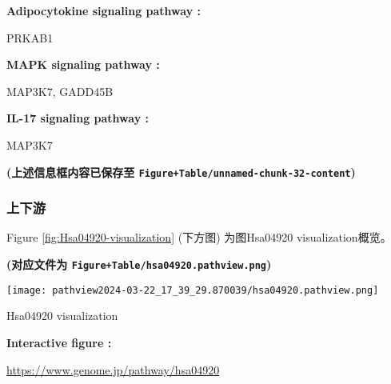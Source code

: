\documentclass[
]{article}
\begin{document}
\begin{center}\begin{tcolorbox}[colback=gray!10, colframe=gray!50, width=0.9\linewidth, arc=1mm, boxrule=0.5pt]
\textbf{
Adipocytokine signaling pathway
:}

\vspace{0.5em}

    PRKAB1

\vspace{2em}


\textbf{
MAPK signaling pathway
:}

\vspace{0.5em}

    MAP3K7, GADD45B

\vspace{2em}


\textbf{
IL-17 signaling pathway
:}

\vspace{0.5em}

    MAP3K7

\vspace{2em}
\end{tcolorbox}
\end{center}

\textbf{(上述信息框内容已保存至 \texttt{Figure+Table/unnamed-chunk-32-content})}

\hypertarget{epi-path}{%
\subsubsection{上下游}\label{epi-path}}

Figure \ref{fig:Hsa04920-visualization} (下方图) 为图Hsa04920 visualization概览。

\textbf{(对应文件为 \texttt{Figure+Table/hsa04920.pathview.png})}

\def\@captype{figure}
\begin{center}
\texttt{[image: pathview2024-03-22\_17\_39\_29.870039/hsa04920.pathview.png]}
\caption{Hsa04920 visualization}\label{fig:Hsa04920-visualization}
\end{center}
\begin{center}\begin{tcolorbox}[colback=gray!10, colframe=gray!50, width=0.9\linewidth, arc=1mm, boxrule=0.5pt]
\textbf{
Interactive figure
:}

\vspace{0.5em}

    \url{https://www.genome.jp/pathway/hsa04920}

\vspace{2em}
\end{tcolorbox}
\end{center}
\end{document}

